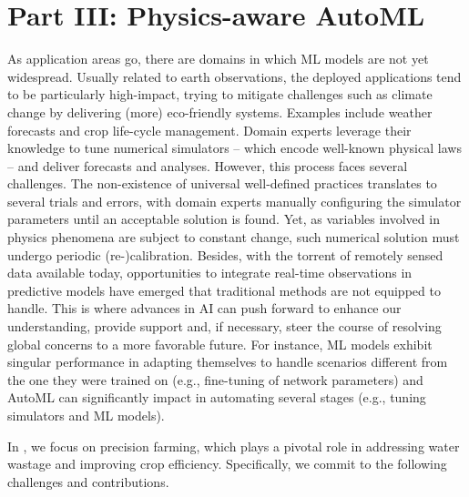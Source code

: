 \section*{Part III: Physics-aware AutoML}

As application areas go, there are domains in which ML models are not yet widespread.
Usually related to earth observations, the deployed applications tend to be particularly high-impact, trying to mitigate challenges such as climate change by delivering (more) eco-friendly systems.
Examples include weather forecasts and crop life-cycle management.
Domain experts leverage their knowledge to tune numerical simulators -- which encode well-known physical laws -- and deliver forecasts and analyses.
However, this process faces several challenges.
The non-existence of universal well-defined practices translates to several trials and errors, with domain experts manually configuring the simulator parameters until an acceptable solution is found.
Yet, as variables involved in physics phenomena are subject to constant change, such numerical solution must undergo periodic (re-)calibration.
Besides, with the torrent of remotely sensed data available today, opportunities to integrate real-time observations in predictive models have emerged that traditional methods are not equipped to handle.
This is where advances in AI can push forward to enhance our understanding, provide support and, if necessary, steer the course of resolving global concerns to a more favorable future.
For instance, ML models exhibit singular performance in adapting themselves to handle scenarios different from the one they were trained on (e.g., fine-tuning of network parameters) and AutoML can significantly impact in automating several stages (e.g., tuning simulators and ML models).

In , we focus on precision farming, which plays a pivotal role in addressing water wastage and improving crop efficiency. Specifically, we commit to the following challenges and contributions.

